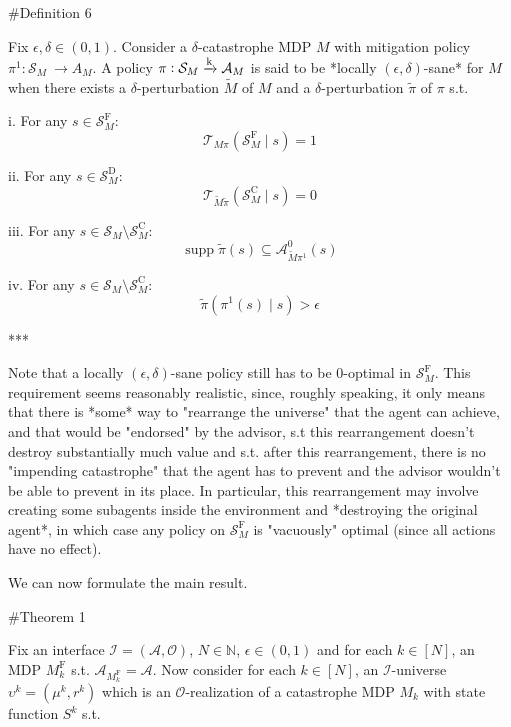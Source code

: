 \documentclass[a4paper]{article}
\newcommand{\Comment}[1]{}
\DeclareMathOperator{\Supp}{supp}
\newcommand{\AP}[1]{\left(#1\right)}
\newcommand{\Nats}{\mathbb{N}}
\newcommand{\M}{\xrightarrow{\textnormal{k}}}
\newcommand{\Ob}{\mathcal{O}}
\newcommand{\A}{\mathcal{A}}
\newcommand{\St}{\mathcal{S}}
\newcommand{\T}{\mathcal{T}}
\newcommand{\In}{\mathcal{I}}
\newcommand{\SF}{\St^{\text{F}}}
\newcommand{\SD}{\St^{\text{D}}}
\newcommand{\SC}{\St^{\text{C}}}
\newcommand{\MF}{M^{\text{F}}}
\begin{document}
\#Definition 6

Fix $\epsilon,\delta \in (0,1)$. Consider a $\delta$-catastrophe MDP $M$ with mitigation policy $\pi^1: \St_M\ \rightarrow A_M$. A policy $\pi: \St_M \M \A_M$ is said to be *locally $(\epsilon,\delta)$-sane* for $M$ when there exists a $\delta$-perturbation $\tilde{M}$ of $M$ and a $\delta$-perturbation $\tilde{\pi}$ of $\pi$ s.t.

i. For any $s \in \SF_M$: $$\T_{M\pi}\AP{\SF_M \mid s} = 1$$

ii. For any $s \in \SD_M$: $$\T_{\tilde{M}\tilde{\pi}}\AP{\SC_M \mid s} = 0$$

iii. For any $s \in \St_M \setminus \SC_M$: $$\Supp{\tilde{\pi}(s)} \subseteq \A_{\tilde{M}\pi^1}^0(s)$$

iv. For any $s \in \St_M \setminus \SC_M$: $$\tilde{\pi}\AP{\pi^1(s) \mid s} > \epsilon$$

\Comment{For $M$ an arbitrary MDP, $s_0 \in \St_M$ and $\tau_1,\tau_2 \in (0,\infty)$, we say $\pi$ is *locally $(\epsilon,\delta)$-sane for $\AP{M,s_0}$ with moments $\tau_1,\tau_2$* when *either* $\pi$ is locally $\epsilon$-sane for $\AP{M,s_0}$ *or* there is *some* way to view $M$ as a $\delta$-catastrophe MDP with $s_0 \in \SD_M$ such that the corresponding mitigation policy $\pi^1$ has moments $\tau_1,\tau_2$ at $s_0$ and $\pi$ is locally $(\epsilon,\delta)$-sane for $M$ in the corresponding sense.}

***

Note that a locally $(\epsilon,\delta)$-sane policy still has to be $0$-optimal in $\SF_M$. This requirement seems reasonably realistic, since, roughly speaking, it only means that there is *some* way to "rearrange the universe" that the agent can achieve, and that would be "endorsed" by the advisor, s.t this rearrangement doesn't destroy substantially much value and s.t. after this rearrangement, there is no "impending catastrophe" that the agent has to prevent and the advisor wouldn't be able to prevent in its place. In particular, this rearrangement may involve creating some subagents inside the environment and *destroying the original agent*, in which case any policy on $\SF_M$ is "vacuously" optimal (since all actions have no effect).

We can now formulate the main result.

\#Theorem 1

Fix an interface $\In=(\A,\Ob)$, $N \in \Nats$, $\epsilon \in (0,1)$ and for each $k \in [N]$, an MDP $\MF_k$ s.t. $\A_{\MF_k} = \A$. Now consider for each $k \in [N]$, an $\In$-universe $\upsilon^k=(\mu^k,r^k)$ which is an $\Ob$-realization of a catastrophe MDP $M_k$ with state function $S^k$ s.t.
\end{document}
